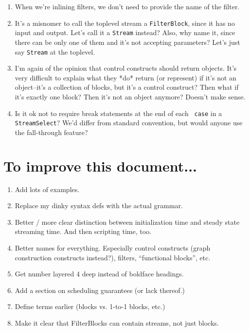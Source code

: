 \documentclass[draft]{article}
\begin{document}
\begin{enumerate}

\item When we're inlining filters, we don't need to provide the name
of the filter.

\item It's a misnomer to call the toplevel stream a {\tt FilterBlock},
since it has no input and output.  Let's call it a {\tt Stream}
instead?  Also, why name it, since there can be only one of them and
it's not accepting parameters?  Let's just say {\tt Stream} at the
toplevel.

\item I'm again of the opinion that control constructs should return
objects.  It's very difficult to explain what they *do* return (or
represent) if it's not an object--it's a collection of blocks, but
it's a control construct?  Then what if it's exactly one block?  Then
it's not an object anymore?  Doesn't make sense.

\item Is it ok not to require break statements at the end of each {\tt
case} in a {\tt StreamSelect}?  We'd differ from standard convention,
but would anyone use the fall-through feature?

\end{enumerate}

\section{To improve this document...}

\begin{enumerate}

\item Add lots of examples.

\item Replace my dinky syntax defs with the actual grammar.

\item Better / more clear distinction between initialization time and
steady state streaming time.  And then scripting time, too.

\item Better names for everything.  Especially control constructs
(graph construction constructs instead?), filters, ``functional
blocks'', etc.

\item Get number layered 4 deep instead of boldface headings.

\item Add a section on scheduling guarantees (or lack thereof.)

\item Define terms earlier (blocks vs. 1-to-1 blocks, etc.)

\item Make it clear that FilterBlocks can contain streams, not just
blocks.

\end{enumerate}
\end{document}
